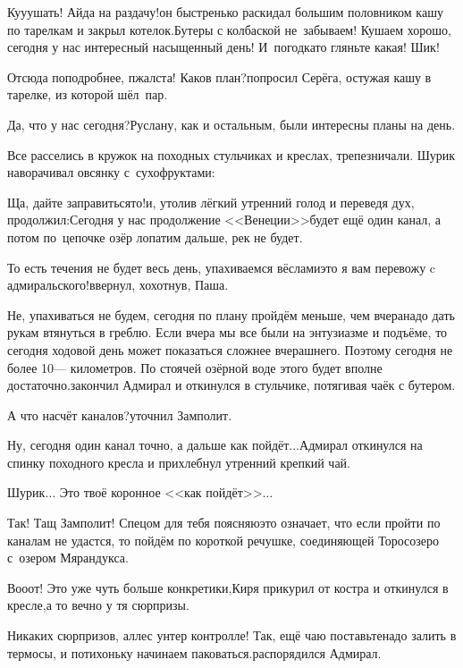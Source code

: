 \diagdash Ку\sdash у\sdash ушать! Айда на раздачу!\mdash он быстренько раскидал большим половником кашу по тарелкам и закрыл котелок.\mdash Бутеры с колбаской не~забываем! Кушаем хорошо, сегодня у нас интересный насыщенный день! И~погодка\sdash то гляньте какая! Шик!

\diagdash Отсюда поподробнее, п\sdash жалста! Каков план?\mdash попросил Серёга, остужая кашу в тарелке, из которой шёл~пар.

\diagdash Да, что у нас сегодня?\mdash Руслану, как и остальным, были интересны планы на день.

Все расселись в кружок на походных стульчиках и креслах, трепезничали. Шурик наворачивал овсянку с~сухофруктами:

\diagdash Ща, дайте заправиться\sdash то!\mdash и, утолив лёгкий утренний голод и переведя дух, продолжил:\mdash Сегодня у нас продолжение <<Венеции>>\mdash будет ещё один канал, а потом по~цепочке озёр лопатим дальше, рек не будет.

\diagdash То есть течения не будет весь день, упахиваемся вёслами\mdash это я вам перевожу c адмиральского!\mdash ввернул, хохотнув, Паша.

\diagdash Не, упахиваться не будем, сегодня по плану пройдём меньше, чем вчера\mdash надо дать рукам втянуться в греблю. Если вчера мы все были на энтузиазме и подъёме, то сегодня ходовой день может показаться сложнее вчерашнего. Поэтому сегодня не более 10\thinspace\nobreakdash--- километров. По стоячей озёрной воде этого будет вполне достаточно.\mdash закончил Адмирал и откинулся в стульчике, потягивая чаёк с бутером.

\diagdash А что насчёт каналов?\mdash уточнил Замполит.

\diagdash Ну, сегодня один канал точно, а дальше как пойдёт$\ldots$\mdash Адмирал откинулся на спинку походного кресла и прихлебнул утренний крепкий чай.

\diagdash Шурик$\ldots$ Это твоё коронное <<как пойдёт>>$\ldots$

\diagdash Так! Тащ Замполит! Спецом для тебя поясняю\mdash это означает, что если пройти по каналам не удастся, то пойдём по короткой речушке, соединяющей Торосозеро с~озером Мярандукса.

\diagdash Во\sdash о\sdash от! Это уже чуть больше конкретики,\mdash Киря прикурил от костра и откинулся в кресле,\mdash а то вечно у тя сюрпризы.

\diagdash Никаких сюрпризов, аллес унтер контролле! Так, ещё чаю поставьте\mdash надо залить в термосы, и потихоньку начинаем паковаться.\mdash распорядился Адмирал.

